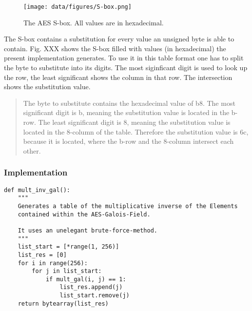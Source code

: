 \begin{figure}
\centering
\texttt{[image: data/figures/S-box.png]} 
\caption{The AES S-box. All values are in hexadecimal.}
\end{figure}


The S-box contains a substitution for every value an unsigned byte is
able to contain. Fig. XXX shows the S-box filled with values (in
hexadecimal) the present implementation generates. To use it in this
table format one has to split the byte to substitute into its digits.
The most siginficant digit is used to look up the row, the least
significant shows the column in that row. The intersection shows the
substitution value.

\begin{quote}
The byte to substitute contains the hexadecimal value of b8. The most
significant digit is b, meaning the substitution value is located in the
b-row. The least significant digit is 8, meaning the substitution value
is located in the 8-column of the table. Therefore the substitution
value is 6c, because it is located, where the b-row and the 8-column
intersect each other.
\end{quote}

\hypertarget{implementation-1}{%
\subsubsection{Implementation}\label{implementation-1}}

\begin{lstlisting}
def mult_inv_gal():
    """
    Generates a table of the multiplicative inverse of the Elements
    contained within the AES-Galois-Field.

    It uses an unelegant brute-force-method.
    """
    list_start = [*range(1, 256)]
    list_res = [0]
    for i in range(256):
        for j in list_start:
            if mult_gal(i, j) == 1:
                list_res.append(j)
                list_start.remove(j)
    return bytearray(list_res)
\end{lstlisting}

